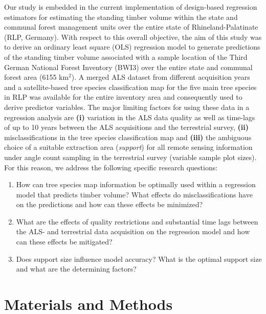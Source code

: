 Our study is embedded in the current implementation of design-based regression estimators \citep{mandallaz2013a, mandallaz2013b, mandallaz2013c} for estimating the standing timber volume within the state and communal forest management units over the entire state of Rhineland-Palatinate (RLP, Germany). With respect to this overall objective, the aim of this study was to derive an ordinary least square (OLS) regression model to generate predictions of the standing timber volume associated with a sample location of the Third German National Forest Inventory (BWI3) over the entire state and communal forest area (6155 km$^2$). A merged ALS dataset from different acquisition years and a satellite-based tree species classification map for the five main tree species in RLP was available for the entire inventory area and consequently used to derive predictor variables. The major limiting factors for using these data in a regression analysis are \textbf{(i)} variation in the ALS data quality as well as time-lags of up to 10 years between the ALS acquisitions and the terrestrial survey, \textbf{(ii)} misclassifications in the tree species classification map and \textbf{(iii)} the ambiguous choice of a suitable extraction area (\textit{support}) for all remote sensing information under angle count sampling in the terrestrial survey (variable sample plot sizes). For this reason, we address the following specific research questions:

\begin{enumerate}
	\setlength\itemsep{1em}
	\item How can tree species map information be optimally used within a regression model that predicts timber volume? What effects do misclassifications have on the predictions and how can these effects be minimized?
	\item What are the effects of quality restrictions and substantial time lags between the ALS- and terrestrial data acquisition on the regression model and how can these effects be mitigated?
	\item Does support size influence model accuracy? What is the optimal support size and what are the determining factors?
\end{enumerate}


\section{Materials and Methods}
\label{sec:MatMeth}

